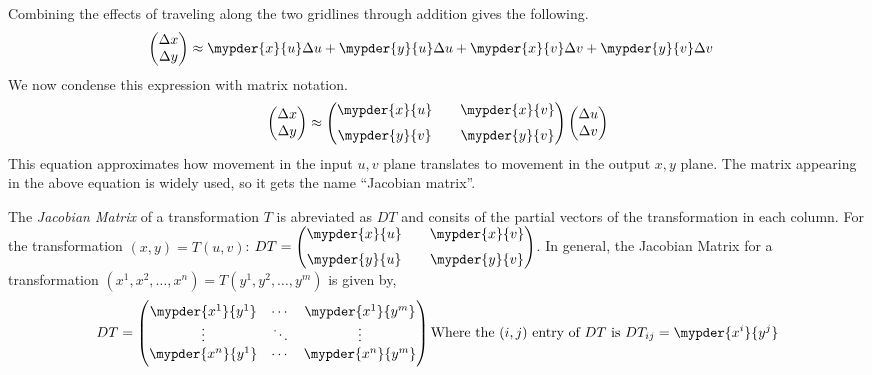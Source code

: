 \documentclass[11pt]{article}
\newenvironment{mybox}
{\begin{tcolorbox}[colback=red!5!white,colframe=red!75!black]}
{\end{tcolorbox}}
\begin{document}
Combining the effects of traveling along the two gridlines through addition gives the following.
\begin{align*}
    \begin{pmatrix} \Delta x \\ \Delta y \end{pmatrix}
    &\approx \mypder{x}{u}\Delta u + \mypder{y}{u}\Delta u
    + \mypder{x}{v}\Delta v + \mypder{y}{v}\Delta v
\end{align*}
We now condense this expression with matrix notation.
\begin{equation}
    \begin{pmatrix} \Delta x \\ \Delta y \end{pmatrix}
    \approx \begin{pmatrix}
    \mypder{x}{u} && \mypder{x}{v} \\[6pt]
    \mypder{y}{v} && \mypder{y}{v}
    \end{pmatrix}
    \begin{pmatrix} \Delta u \\ \Delta v \end{pmatrix}
    \label{eq:linearization}
\end{equation}
This equation approximates how movement in the input $u,v$ plane translates to movement in the output $x,y$ plane. The matrix appearing in the above equation is widely used, so it gets the name ``Jacobian matrix''.
\begin{mybox}
    The \textit{Jacobian Matrix} of a transformation $T$ is abreviated as $DT$ and consits of the partial vectors of the transformation in each column. For the transformation $(x,y) = T(u,v)$:
        $DT = \begin{pmatrix}
        \mypder{x}{u} && \mypder{x}{v} \\[6pt]
        \mypder{y}{u} && \mypder{y}{v}
    \end{pmatrix}$.
    In general, the Jacobian Matrix for a transformation $(x^1,x^2,\ldots,x^n) = T(y^1,y^2,\ldots,y^m)$ is given by,
    \begin{equation*}
    DT = \begin{pmatrix}
        \mypder{x^1}{y^1} & \cdots & \mypder{x^1}{y^m} \\
        \vdots            & \ddots& \vdots\\
        \mypder{x^n}{y^1} & \cdots & \mypder{x^n}{y^m}
    \end{pmatrix}
    \text{Where the $(i,j)$ entry of $DT$ is $DT_{ij} = \mypder{x^i}{y^j}$}
    \end{equation*}
\end{mybox}
\end{document}
